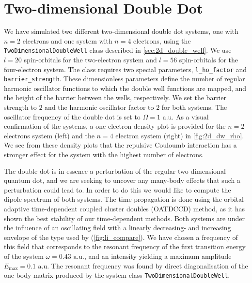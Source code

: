 \section{Two-dimensional Double Dot}

We have simulated two different two-dimensional double dot systems, one with $n=2$ electrons 
and 
one system with $n=4$ electrons, using the \lstinline{TwoDimensionalDoubleWell} class described
in \autoref{sec:2d_double_well}. We use $l=20$ spin-orbitals for the two-electron system 
and $l=56$ spin-orbitals for the four-electron system. The class requires two special parameters, 
\lstinline{l_ho_factor} and \lstinline{barrier_strength}. These dimensionless parameters
define the number of regular harmonic oscillator functions to which the double well
functions are mapped, and the height of the 
barrier between the wells, respectively. We set the barrier strength to $2$ 
and the harmonic oscillator factor to $2$ for both systems. The oscillator frequency 
of the double dot is set to $\Omega=1 \text{ a.u.}$ As a visual confirmation of the systems, a 
one-electron density plot is provided for the $n=2$ electrons system (left) and 
the $n=4$ electron system (right) in \autoref{fig:2d_dw_rho}. We see from these density plots 
that the repulsive Couloumb interaction has a stronger effect for the system with the 
highest number of electrons.

The double dot is in essence a perturbation of the regular two-dimensional quantum dot,
and we are seeking to uncover any many-body 
effects that such a perturbation could lead to. In order to do this we would like to 
compute the dipole spectrum of both systems. The time-propagation is done using the 
orbital-adaptive time-dependent coupled cluster doubles (OATDCCD) method, as it has shown 
the best stability of our time-dependent methods. Both systems are under the influence of an 
oscillating field with a linearly decreasing- and increasing envelope of the type used by 
\citeauthor{li2005time} \cite{li2005time} (\autoref{fig:li_compare}). We have chosen a 
frequency of this field that corresponds to the resonant frequency of the first transition energy 
of the system $\omega = 0.43 \text{ a.u.}$, and an intensity yielding a maximum amplitude
$E_\text{max} = 0.1 \text{ a.u.}$ The resonant frequency was found by direct diagonalisation 
of the one-body matrix produced by the system class \lstinline{TwoDimensionalDoubleWell}.

